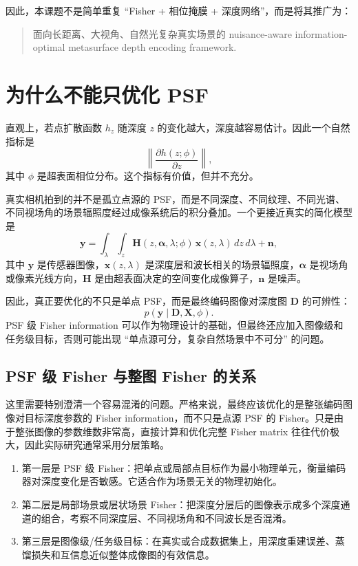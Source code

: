\documentclass[11pt,a4paper,fontset=none]{ctexart}
\begin{document}
因此，本课题不是简单重复 ``Fisher + 相位掩膜 + 深度网络''，而是将其推广为：
\begin{quote}
面向长距离、大视角、自然光复杂真实场景的 nuisance-aware information-optimal metasurface depth encoding framework.
\end{quote}

\section{为什么不能只优化 PSF}

直观上，若点扩散函数 $h_z$ 随深度 $z$ 的变化越大，深度越容易估计。因此一个自然指标是
\begin{equation}
  \left\| \frac{\partial h(z;\phi)}{\partial z} \right\|,
\end{equation}
其中 $\phi$ 是超表面相位分布。这个指标有价值，但并不充分。

真实相机拍到的并不是孤立点源的 PSF，而是不同深度、不同纹理、不同光谱、不同视场角的场景辐照度经过成像系统后的积分叠加。一个更接近真实的简化模型是
\begin{equation}
  \bm y =
  \int_{\lambda}
  \int_{z}
  \bm H(z,\bm \alpha,\lambda;\phi)\,
  \bm x(z,\lambda)\,dz\,d\lambda
  + \bm n ,
  \label{eq:image_formation}
\end{equation}
其中 $\bm y$ 是传感器图像，$\bm x(z,\lambda)$ 是深度层和波长相关的场景辐照度，$\bm \alpha$ 是视场角或像素光线方向，$\bm H$ 是由超表面决定的空间变化成像算子，$\bm n$ 是噪声。

因此，真正要优化的不只是单点 PSF，而是最终编码图像对深度图 $\bm D$ 的可辨性：
\begin{equation}
  p(\bm y \mid \bm D,\bm X,\phi).
\end{equation}
PSF 级 Fisher information 可以作为物理设计的基础，但最终还应加入图像级和任务级目标，否则可能出现 ``单点源可分，复杂自然场景中不可分'' 的问题。

\subsection{PSF 级 Fisher 与整图 Fisher 的关系}

这里需要特别澄清一个容易混淆的问题。严格来说，最终应该优化的是整张编码图像对目标深度参数的 Fisher information，而不只是点源 PSF 的 Fisher。只是由于整张图像的参数维数非常高，直接计算和优化完整 Fisher matrix 往往代价极大，因此实际研究通常采用分层策略。

\begin{enumerate}
  \item 第一层是 PSF 级 Fisher：把单点或局部点目标作为最小物理单元，衡量编码器对深度变化是否敏感。它适合作为场景无关的物理初始化。
  \item 第二层是局部场景或层状场景 Fisher：把深度分层后的图像表示成多个深度通道的组合，考察不同深度层、不同视场角和不同波长是否混淆。
  \item 第三层是图像级/任务级目标：在真实或合成数据集上，用深度重建误差、蒸馏损失和互信息近似整体成像图的有效信息。
\end{enumerate}
\end{document}
